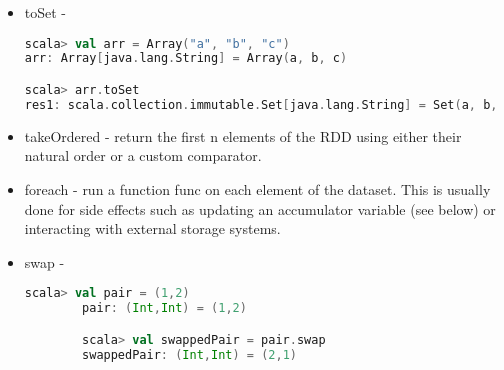 \documentclass[paper=a4, fontsize=11pt]{scrartcl}
\numberwithin{equation}{section}		%
\numberwithin{figure}{section}			%
\numberwithin{table}{section}				%
\begin{document}
\begin{itemize}
\begin{lstlisting}[language=scala]
\end{lstlisting}
	\item toSet -
\begin{lstlisting}[language=scala]
scala> val arr = Array("a", "b", "c")
arr: Array[java.lang.String] = Array(a, b, c)

scala> arr.toSet
res1: scala.collection.immutable.Set[java.lang.String] = Set(a, b, c)
\end{lstlisting}
	\item takeOrdered - return the first n elements of the RDD using either their natural order or a custom comparator.
	\item foreach - run a function func on each element of the dataset. This is usually done for side effects such as updating an accumulator variable (see below) or interacting with external storage systems. 
	\item swap -
		\begin{lstlisting}[language=scala]
		scala> val pair = (1,2)
		pair: (Int,Int) = (1,2)

		scala> val swappedPair = pair.swap
		swappedPair: (Int,Int) = (2,1)
		\end{lstlisting}
\end{itemize}
\end{document}
